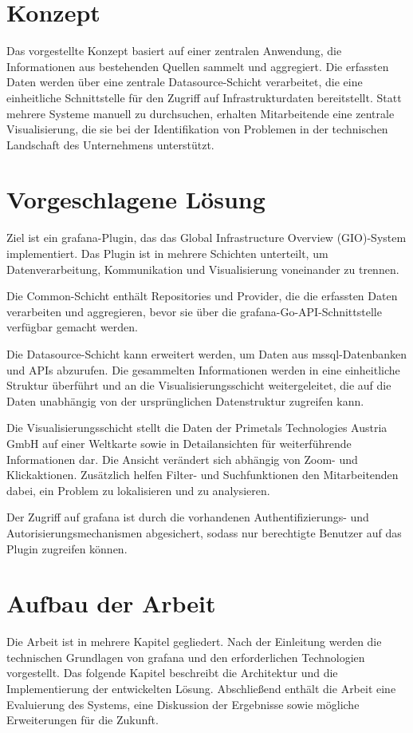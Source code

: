 \section{Konzept}

Das vorgestellte Konzept basiert auf einer zentralen Anwendung, die
Informationen aus bestehenden Quellen sammelt und aggregiert. Die erfassten
Daten werden über eine zentrale Datasource-Schicht verarbeitet, die eine
einheitliche Schnittstelle für den Zugriff auf Infrastrukturdaten bereitstellt.
Statt mehrere Systeme manuell zu durchsuchen, erhalten Mitarbeitende eine
zentrale Visualisierung, die sie bei der Identifikation von Problemen in der
technischen Landschaft des Unternehmens unterstützt.

\section{Vorgeschlagene Lösung}

Ziel ist ein \gls{grafana}-Plugin, das das Global Infrastructure Overview
(GIO)-System implementiert. Das Plugin ist in mehrere Schichten unterteilt, um
Datenverarbeitung, Kommunikation und Visualisierung voneinander zu trennen.

Die Common-Schicht enthält Repositories und Provider, die die erfassten Daten
verarbeiten und aggregieren, bevor sie über die \gls{grafana}-Go-API-Schnittstelle
verfügbar gemacht werden.

Die Datasource-Schicht kann erweitert werden, um Daten aus \gls{mssql}-Datenbanken
und APIs abzurufen. Die gesammelten Informationen werden in eine einheitliche
Struktur überführt und an die Visualisierungsschicht weitergeleitet, die auf die
Daten unabhängig von der ursprünglichen Datenstruktur zugreifen kann.

Die Visualisierungsschicht stellt die Daten der Primetals Technologies Austria
GmbH auf einer Weltkarte sowie in Detailansichten für weiterführende
Informationen dar. Die Ansicht verändert sich abhängig von Zoom- und
Klickaktionen. Zusätzlich helfen Filter- und Suchfunktionen den Mitarbeitenden
dabei, ein Problem zu lokalisieren und zu analysieren.

Der Zugriff auf \gls{grafana} ist durch die vorhandenen Authentifizierungs- und
Autorisierungsmechanismen abgesichert, sodass nur berechtigte Benutzer auf das
Plugin zugreifen können.

\section{Aufbau der Arbeit}

Die Arbeit ist in mehrere Kapitel gegliedert. Nach der Einleitung werden die
technischen Grundlagen von \gls{grafana} und den erforderlichen Technologien
vorgestellt. Das folgende Kapitel beschreibt die Architektur und die
Implementierung der entwickelten Lösung. Abschließend enthält die Arbeit eine
Evaluierung des Systems, eine Diskussion der Ergebnisse sowie mögliche
Erweiterungen für die Zukunft.